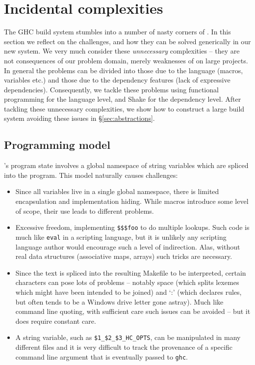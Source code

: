 
\section{Incidental complexities\label{sec:challenges}}

The GHC build system stumbles into a number of nasty corners of \make{}. In this section we reflect on the challenges, and how they can be solved generically in our new system. We very much consider these \textit{unnecessary} complexities -- they are not consequences of our problem domain, merely weaknesses of \make{} on large projects. In general the problems can be divided into those due to the \make{} language (macros, variables etc.) and those due to the \make{} dependency features (lack of expressive dependencies). Consequently, we tackle these problems using functional programming for the language level, and Shake for the dependency level. After tackling these unnecessary complexities, we show how to construct a large build system avoiding these issues in \S\ref{sec:abstractions}.

\subsection{Programming model}

\make{}'s program state involves a global namespace of string variables which are spliced into the program. This model naturally causes challenges:

\begin{itemize}
\item Since all variables live in a single global namespace, there is limited encapsulation and implementation hiding. While macros introduce some level of scope, their use leads to different problems.
\item Excessive freedom, implementing \texttt{\$\$\$foo} to do multiple lookups. Such code is much like \texttt{eval} in a scripting language, but it is unlikely any scripting language author would encourage such a level of indirection. Alas, without real data structures (associative maps, arrays) such tricks are necessary.
\item Since the text is spliced into the resulting Makefile to be interpreted, certain characters can pose lots of problems -- notably space (which splits lexemes which might have been intended to be joined) and `:' (which declares rules, but often tends to be a Windows drive letter gone astray). Much like command line quoting, with sufficient care such issues can be avoided -- but it does require constant care.
\item A string variable, such as \texttt{\$1\_\$2\_\$3\_HC\_OPTS}, can be manipulated in many different files and it is very difficult to track the provenance of a specific command line argument that is eventually passed to \texttt{ghc}.
\end{itemize}

